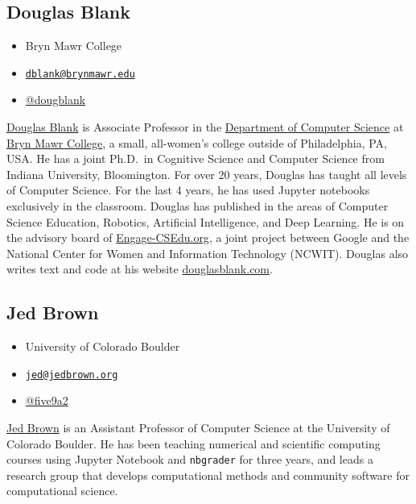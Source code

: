 \documentclass[]{book}
\providecommand{\tightlist}{%
  \setlength{\itemsep}{0pt}\setlength{\parskip}{0pt}}
\begin{document}
\subsection*{Douglas Blank}\label{douglas-blank}

\begin{itemize}
\tightlist
\item
  Bryn Mawr College
\item
  \href{mailto:dblank@brynmawr.edu}{\nolinkurl{dblank@brynmawr.edu}}
\item
  \href{https://twitter.com/dougblank}{@dougblank}
\end{itemize}

\href{https://cs.brynmawr.edu/~dblank/}{Douglas Blank} is Associate
Professor in the \href{https://cs.brynmawr.edu/}{Department of Computer
Science} at \href{http://brynmawr.edu/}{Bryn Mawr College}, a small,
all-women's college outside of Philadelphia, PA, USA. He has a joint
Ph.D.~in Cognitive Science and Computer Science from Indiana University,
Bloomington. For over 20 years, Douglas has taught all levels of
Computer Science. For the last 4 years, he has used Jupyter notebooks
exclusively in the classroom. Douglas has published in the areas of
Computer Science Education, Robotics, Artificial Intelligence, and Deep
Learning. He is on the advisory board of
\href{https://www.engage-csedu.org}{Engage-CSEdu.org}, a joint project
between Google and the National Center for Women and Information
Technology (NCWIT). Douglas also writes text and code at his website
\href{http://douglasblank.com}{douglasblank.com}.

\subsection*{Jed Brown}\label{jed-brown}

\begin{itemize}
\tightlist
\item
  University of Colorado Boulder
\item
  \href{mailto:jed@jedbrown.org}{\nolinkurl{jed@jedbrown.org}}
\item
  \href{https://twitter.com/five9a2}{@five9a2}
\end{itemize}

\href{https://jedbrown.org/}{Jed Brown} is an Assistant Professor of
Computer Science at the University of Colorado Boulder. He has been
teaching numerical and scientific computing courses using Jupyter
Notebook and \texttt{nbgrader} for three years, and leads a research
group that develops computational methods and community software for
computational science.
\end{document}
